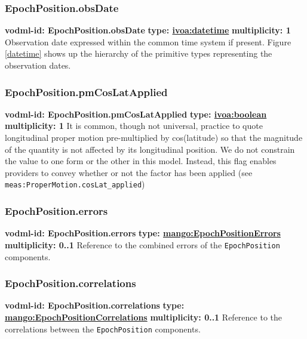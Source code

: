     \subsubsection{EpochPosition.obsDate}
    \textbf{vodml-id: EpochPosition.obsDate} \newline
    \textbf{type: \hyperref[sect:ivoa]{ivoa:datetime}} \newline
    \textbf{multiplicity: 1} \newline
    Observation date expressed within the common time system if present. Figure \ref{datetime} shows up the hierarchy of the primitive types representing the observation dates.

    \subsubsection{EpochPosition.pmCosLatApplied}
    \textbf{vodml-id: EpochPosition.pmCosLatApplied} \newline
    \textbf{type: \hyperref[sect:ivoa]{ivoa:boolean}} \newline
    \textbf{multiplicity: 1} \newline
    It is common, though not universal, practice to quote longitudinal proper motion pre-multiplied by cos(latitude) so that the magnitude of the quantity is not affected by its longitudinal position. We do not constrain the value to one form or the other in this model. Instead, this flag enables providers to convey whether or not the factor has been applied (see \texttt{meas:ProperMotion.cosLat\_applied})

    \subsubsection{EpochPosition.errors}
    \textbf{vodml-id: EpochPosition.errors} \newline
    \textbf{type: \hyperref[sect:EpochPositionErrors]{mango:EpochPositionErrors}} \newline
    \textbf{multiplicity: 0..1} \newline
    Reference to the combined errors of the \texttt{EpochPosition} components.

    \subsubsection{EpochPosition.correlations}
    \textbf{vodml-id: EpochPosition.correlations} \newline
    \textbf{type: \hyperref[sect:EpochPositionCorrelations]{mango:EpochPositionCorrelations}} \newline
    \textbf{multiplicity: 0..1} \newline
    Reference to the correlations between the \texttt{EpochPosition} components.

